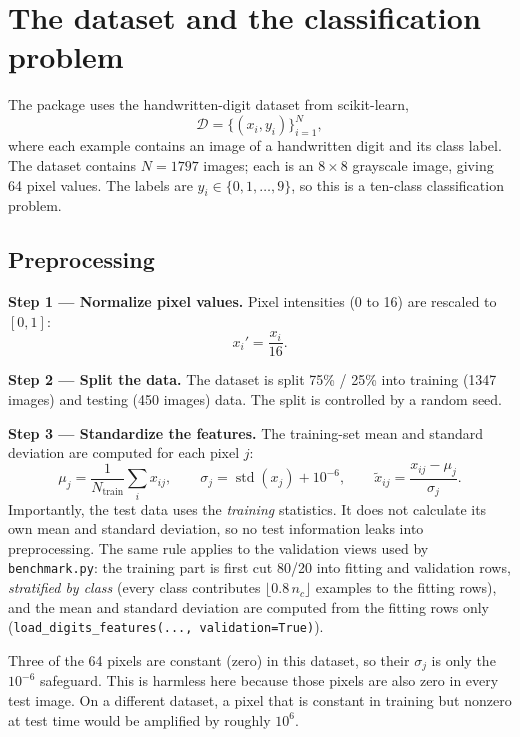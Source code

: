 \documentclass[11pt,a4paper]{article}
\newcommand{\code}[1]{\texttt{#1}}
\begin{document}
\section{The dataset and the classification problem}

The package uses the handwritten-digit dataset from scikit-learn,
\[
\mathcal D=\{(x_i,y_i)\}_{i=1}^{N},
\]
where each example contains an image of a handwritten digit and its class label. The dataset contains $N=1797$ images; each is an $8\times 8$ grayscale image, giving 64 pixel values. The labels are $y_i\in\{0,1,\ldots,9\}$, so this is a ten-class classification problem.

\subsection{Preprocessing}

\textbf{Step 1 --- Normalize pixel values.} Pixel intensities (0 to 16) are rescaled to $[0,1]$:
\[
x_i'=\frac{x_i}{16}.
\]

\textbf{Step 2 --- Split the data.} The dataset is split 75\% / 25\% into training (1347 images) and testing (450 images) data. The split is controlled by a random seed.

\textbf{Step 3 --- Standardize the features.} The training-set mean and standard deviation are computed for each pixel $j$:
\[
\mu_j=\frac{1}{N_{\text{train}}}\sum_i x_{ij},
\qquad
\sigma_j=\operatorname{std}(x_j)+10^{-6},
\qquad
\tilde x_{ij}=\frac{x_{ij}-\mu_j}{\sigma_j}.
\]
Importantly, the test data uses the \emph{training} statistics. It does not calculate its own mean and standard deviation, so no test information leaks into preprocessing. The same rule applies to the validation views used by \code{benchmark.py}: the training part is first cut 80/20 into fitting and validation rows, \emph{stratified by class} (every class contributes $\lfloor 0.8\,n_c\rfloor$ examples to the fitting rows), and the mean and standard deviation are computed from the fitting rows only (\code{load\_digits\_features(..., validation=True)}).

\begin{reviewbox}
Three of the 64 pixels are constant (zero) in this dataset, so their $\sigma_j$ is only the $10^{-6}$ safeguard. This is harmless here because those pixels are also zero in every test image. On a different dataset, a pixel that is constant in training but nonzero at test time would be amplified by roughly $10^{6}$.
\end{reviewbox}
\end{document}
